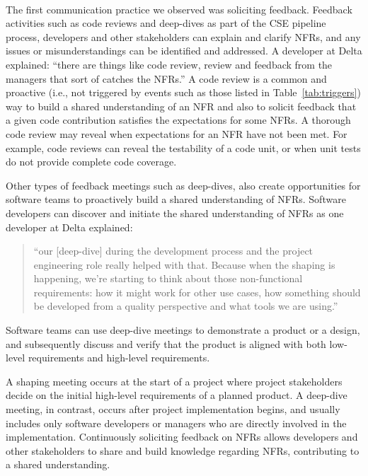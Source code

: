 \documentclass[smallextended]{svjour3}        %
\providecommand{\DIFaddtex}[1]{{\protect\color{blue}\uwave{#1}}} %
\providecommand{\DIFaddbegin}{} %
\providecommand{\DIFaddend}{} %
\providecommand{\DIFadd}[1]{\texorpdfstring{\DIFaddtex{#1}}{#1}} %
\newcommand{\DIFaddincludegraphics}[2][]{{\color{blue}\fbox{\DIFOincludegraphics[#1]{#2}}}} %
\DeclareRobustCommand{\DIFaddbegin}{\DIFOaddbegin \let\includegraphics\DIFaddincludegraphics} %
\DeclareRobustCommand{\DIFaddend}{\DIFOaddend \let\includegraphics\DIFOincludegraphics} %
\begin{document}
\DIFaddbegin \paragraph{\DIFadd{Soliciting Feedback}} \DIFaddend The first communication practice we observed was soliciting feedback. Feedback activities such as code reviews and deep-dives as part of the CSE pipeline process, developers and other stakeholders can explain and clarify NFRs, and any issues or misunderstandings can be identified and addressed. A developer at Delta explained: 
\textmd{``there are things like code review, review and feedback from the managers that sort of catches the NFRs.''}
A code review is a common and proactive (i.e., not triggered by events such as those listed in Table~\ref{tab:triggers}) way to build a shared understanding of an NFR and also to solicit feedback that a given code contribution satisfies the expectations for some NFRs.
A thorough code review may reveal when 
expectations for an NFR have not been met. For example, code reviews can reveal the testability of a code unit, or when unit tests do not provide complete code coverage. 

Other types of feedback meetings such as deep-dives, also create opportunities for software teams to proactively build a shared understanding of NFRs.
Software developers can discover and initiate the shared understanding of NFRs as one developer at Delta explained: 
\begin{quote}
    ``our [deep-dive] during the development process and the project engineering role really helped with that. Because when the shaping is happening, we're starting to think about those non-functional requirements: how it might work for other use cases, how something should be developed from a quality perspective and what tools we are using.''    
\end{quote}
Software teams can use deep-dive meetings to demonstrate a product or a design, and subsequently discuss and verify that the product is aligned with both low-level requirements and high-level requirements.

A shaping meeting occurs at the start of a project where project stakeholders decide on the initial high-level requirements of a planned product. A deep-dive meeting, in contrast, occurs after project implementation begins, and usually includes only software developers or managers who are directly involved in the implementation. 
Continuously soliciting feedback on NFRs allows developers and other stakeholders to share and build knowledge regarding NFRs, contributing to a shared understanding.
\end{document}
